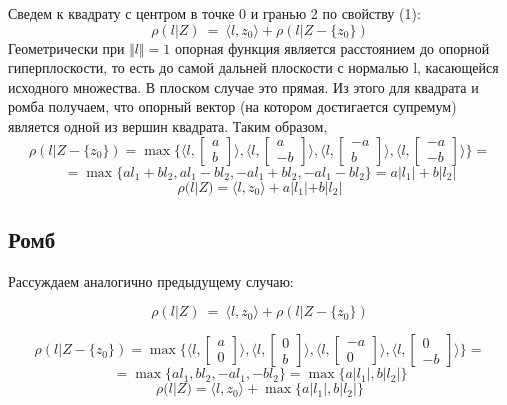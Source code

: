 \documentclass[11pt]{article}
\begin{document}
Сведем к квадрату с центром в точке 0 и гранью 2 по свойству (1):
\[\rho(l|Z)~=~ \langle l, z_0 \rangle + \rho(l | Z - \{z_0\})\]
Геометрически при $\Vert l \Vert = 1$ опорная функция является расстоянием до опорной гиперплоскости, то есть до самой дальней плоскости с нормалью l, касающейся исходного множества. В плоском случае это прямая. Из этого для квадрата и ромба получаем, что опорный вектор (на котором достигается супремум) является одной из вершин квадрата. Таким образом,
\[
\rho(l | Z - \{z_0\}) = \max\{ \langle l, \begin{bmatrix}
           a \\
           b
         \end{bmatrix} \rangle,
         \langle l, \begin{bmatrix}
           a \\
           -b
         \end{bmatrix} \rangle,
         \langle l, \begin{bmatrix}
           -a \\
           b
         \end{bmatrix} \rangle,
         \langle l, \begin{bmatrix}
           -a \\
           -b
         \end{bmatrix} \rangle \} =\]
\[= \max\{a l_1 + b l_2, a l_1 - b l_2, -a l_1 + b l_2, -a l_1 - b l_2\} = a |l_1| + b |l_2|\]
\[\rho(l|Z) = \langle l, z_0 \rangle + a |l_1| + b |l_2|\]

\subsection{Ромб}

Рассуждаем аналогично предыдущему случаю:

\[\rho(l|Z)~=~ \langle l, z_0 \rangle + \rho(l | Z - \{z_0\})\]

\[
\rho(l | Z - \{z_0\}) = \max\{ \langle l, \begin{bmatrix}
           a \\
           0
         \end{bmatrix} \rangle,
         \langle l, \begin{bmatrix}
           0 \\
           b
         \end{bmatrix} \rangle,
         \langle l, \begin{bmatrix}
           -a \\
           0
         \end{bmatrix} \rangle,
         \langle l, \begin{bmatrix}
           0 \\
           -b
         \end{bmatrix} \rangle \} =\]
\[= \max\{a l_1, b l_2, -a l_1, -b l_2\} = \max\{a |l_1|, b |l_2|\}\]
\[\rho(l|Z) = \langle l, z_0 \rangle + \max\{a |l_1|, b |l_2|\}\]
\end{document}
